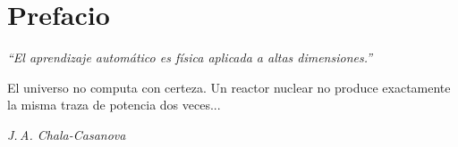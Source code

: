 \chapter*{Prefacio}

\begin{flushright}
\itshape
``El aprendizaje automático es física aplicada a altas dimensiones.''
\end{flushright}
\bigskip

El universo no computa con certeza. Un reactor nuclear no produce exactamente
la misma traza de potencia dos veces...


\vspace{1.2cm}
\begin{flushright}
\textit{J.\,A. Chala-Casanova}\\[2pt]
\the\year
\end{flushright}